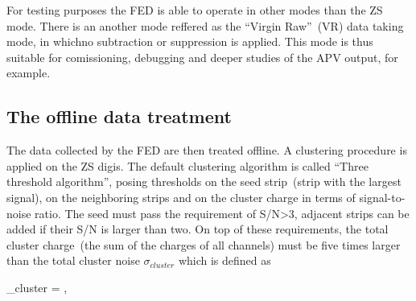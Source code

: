For testing purposes the FED is able to operate in other modes than the ZS mode. There is an another mode reffered as the ``Virgin Raw''~(VR) data taking mode, in whichno subtraction or suppression is applied. This mode is thus suitable for comissioning, debugging and deeper studies of the APV output, for example.





\subsection{The offline data treatment}


The data collected by the FED are then treated offline. A clustering procedure is applied on the ZS digis. The default clustering algorithm is called ``Three threshold algorithm'', posing thresholds on the seed strip~(strip with the largest signal), on the neighboring strips and on the cluster charge in terms of signal-to-noise ratio. The seed must pass the requirement of S/N>3, adjacent strips can be added if their S/N is larger than two. On top of these requirements, the total cluster charge~(the sum of the charges of all channels) must be five times larger than the total cluster noise $\sigma_{cluster}$ which is defined as


{
    \sigma_{cluster} = ,
}

